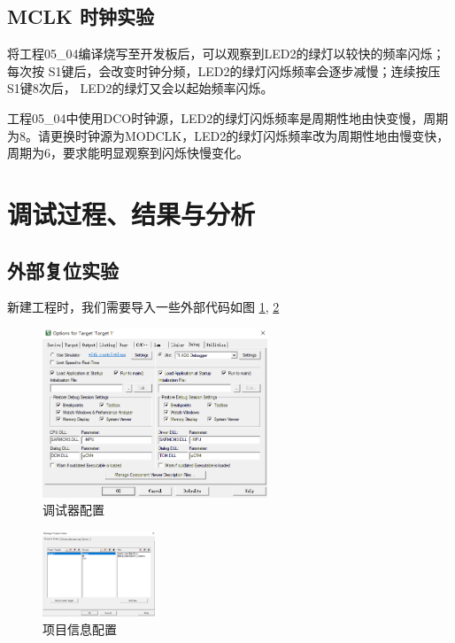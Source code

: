 \documentclass[a4paper,10pt,UTF8]{paper}
\numberwithin{equation}{section}
\numberwithin{figure}{section}
\begin{document}
\subsection{MCLK 时钟实验}

将工程05\_04编译烧写至开发板后，可以观察到LED2的绿灯以较快的频率闪烁；每次按 S1键后，会改变时钟分频，LED2的绿灯闪烁频率会逐步减慢；连续按压S1键8次后， LED2的绿灯又会以起始频率闪烁。

工程05\_04中使用DCO时钟源，LED2的绿灯闪烁频率是周期性地由快变慢，周期为8。请更换时钟源为MODCLK，LED2的绿灯闪烁频率改为周期性地由慢变快，周期为6，要求能明显观察到闪烁快慢变化。


\section{调试过程、结果与分析}

\subsection{外部复位实验}


新建工程时，我们需要导入一些外部代码如图 \ref{fig:6}, \ref{fig:7}

\begin{figure}[h]
  \centering
  \includegraphics[width=0.6\textwidth]{6.png}
  \caption{调试器配置}
  \label{fig:6}
\end{figure}

\begin{figure}[h]
  \centering
  \includegraphics[width=0.3\textwidth]{7.png}
  \caption{项目信息配置}
  \label{fig:7}
\end{figure}
\end{document}
